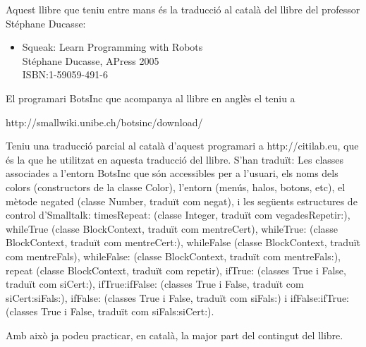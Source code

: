 \noindent
Aquest llibre que teniu entre mans és la traducció al català del llibre del professor Stéphane Ducasse:

\vspace*{3mm}

\noindent
\begin{itemize}
\item[] \textsf{Squeak: Learn Programming with Robots} \\ 
Stéphane Ducasse, APress 2005\\
ISBN:1-59059-491-6
\end{itemize}

\vspace*{3mm}

\noindent
El programari \textsf{BotsInc} que acompanya al llibre en anglès el teniu a 

\noindent
\textsf{http://smallwiki.unibe.ch/botsinc/download/}

\vspace*{3mm}

\noindent
Teniu una traducció parcial al català d'aquest programari a \textsf{http://citilab.eu}, que és la que he utilitzat en aquesta traducció del llibre. S'han traduït: Les classes associades a l'entorn \textsf{BotsInc} que són accessibles per a l'usuari, els noms dels colors (constructors de la classe \textsf{Color}), l'entorn (menús, halos, botons, etc), el mètode
\textsf{negated}  (classe \textsf{Number}, traduït com \textsf{negat}), i les següents estructures de control d'Smalltalk:
\textsf{timesRepeat:}  (classe \textsf{Integer}, traduït com \textsf{vegadesRepetir:}),
 \textsf{whileTrue}  (classe \textsf{BlockContext}, traduït com \textsf{mentreCert}),
 \textsf{whileTrue:}  (classe \textsf{BlockContext}, traduït com \textsf{mentreCert:}),
 \textsf{whileFalse}  (classe \textsf{BlockContext}, traduït com \textsf{mentreFals}),
 \textsf{whileFalse:}  (classe \textsf{BlockContext}, traduït com \textsf{mentreFals:}),
 \textsf{repeat}  (classe \textsf{BlockContext}, traduït com \textsf{repetir}),
 \textsf{ifTrue:}  (classes \textsf{True} i \textsf{False}, traduït com \textsf{siCert:}),
 \textsf{ifTrue:ifFalse:}  (classes \textsf{True} i \textsf{False}, traduït com \textsf{siCert:siFals:}),
 \textsf{ifFalse:}  (classes \textsf{True} i \textsf{False}, traduït com \textsf{siFals:}) i
 \textsf{ifFalse:ifTrue:}  (classes \textsf{True} i \textsf{False}, traduït com \textsf{siFals:siCert:}).

\noindent
Amb això ja podeu practicar, en català, la major part del contingut del llibre.

